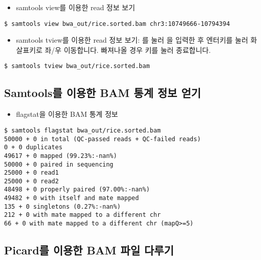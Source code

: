 \documentclass{article}
\begin{document}
\begin{itemize}
\item
  \begin{itemize}
  samtools view를 이용한 read 정보 보기  
  \end{itemize}
\end{itemize}
\begin{lstlisting}[frame=single,style=Bash,xleftmargin=1.4cm,xrightmargin=1.4cm]
$ samtools view bwa_out/rice.sorted.bam chr3:10749666-10794394
\end{lstlisting}

\begin{itemize}
\item
  \begin{itemize}
  samtools tview를 이용한 read 정보 보기: 를 눌러 을 입력한 후 엔터키를 눌러 화살표키로 좌/우 이동합니다. 빠져나올 경우 키를 눌러 종료합니다.
  \end{itemize}
\end{itemize}
\begin{lstlisting}[frame=single,style=Bash,xleftmargin=1.4cm,xrightmargin=1.4cm]
$ samtools tview bwa_out/rice.sorted.bam
\end{lstlisting}


\subsection{Samtools를 이용한 BAM 통계 정보 얻기}

\begin{itemize}
\item
  \begin{itemize}
  flagstat을 이용한 BAM 통계 정보   
  \end{itemize}
\end{itemize}
\begin{lstlisting}[frame=single,style=Bash,xleftmargin=1.4cm,xrightmargin=1.4cm]
$ samtools flagstat bwa_out/rice.sorted.bam
50000 + 0 in total (QC-passed reads + QC-failed reads)
0 + 0 duplicates
49617 + 0 mapped (99.23%:-nan%)
50000 + 0 paired in sequencing
25000 + 0 read1
25000 + 0 read2
48498 + 0 properly paired (97.00%:-nan%)
49482 + 0 with itself and mate mapped
135 + 0 singletons (0.27%:-nan%)
212 + 0 with mate mapped to a different chr
66 + 0 with mate mapped to a different chr (mapQ>=5)
\end{lstlisting}

\subsection{Picard를 이용한 BAM 파일 다루기}
\end{document}
